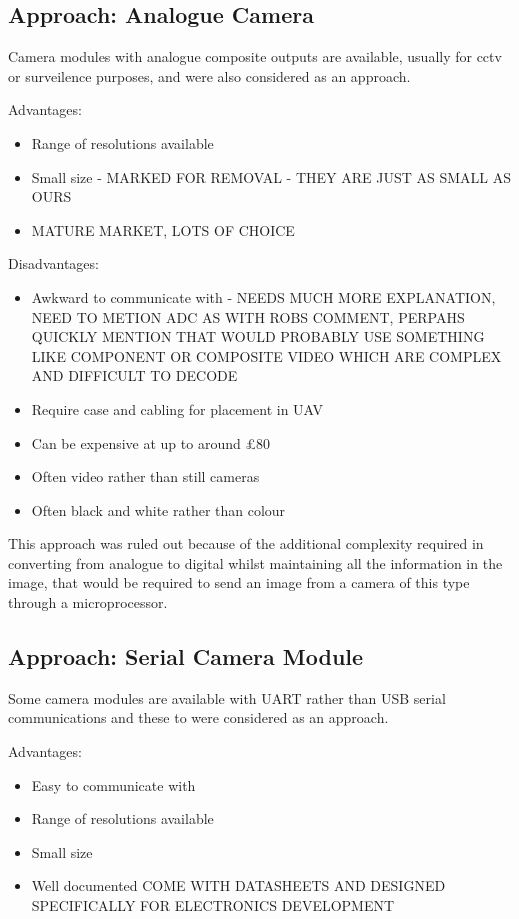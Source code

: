 \subsection{Approach: Analogue Camera}
\label{sec:Analog_option}
Camera modules with analogue composite outputs are available, usually for cctv or surveilence purposes, and were also considered as an approach.

Advantages:
      \begin{itemize}
         \item Range of resolutions available
	\item Small size - MARKED FOR REMOVAL - THEY ARE JUST AS SMALL AS OURS
	\item MATURE MARKET, LOTS OF CHOICE
	
     \end{itemize}

Disadvantages:
     \begin{itemize}
        \item Awkward to communicate with - NEEDS MUCH MORE EXPLANATION, NEED TO METION ADC AS WITH ROBS COMMENT, PERPAHS QUICKLY MENTION THAT WOULD PROBABLY USE SOMETHING LIKE COMPONENT OR COMPOSITE VIDEO WHICH ARE COMPLEX AND DIFFICULT TO DECODE
        \item Require case and cabling for placement in UAV
		\item Can be expensive at up to around \pounds 80
		\item Often video rather than still cameras
		\item Often black and white rather than colour
     \end{itemize}

This approach was ruled out because of the additional complexity required in converting from analogue to digital whilst maintaining all the information in the image, that would be required to send an image from a camera of this type through a microprocessor.

\subsection{Approach: Serial Camera Module}
\label{sec:Serial_option}
Some camera modules are available with UART rather than USB serial communications and these to were considered as an approach.

Advantages:
      \begin{itemize}
		 \item Easy to communicate with
         \item Range of resolutions available
		 \item Small size
		 \item Well documented COME WITH DATASHEETS AND DESIGNED SPECIFICALLY FOR ELECTRONICS DEVELOPMENT
     \end{itemize}

